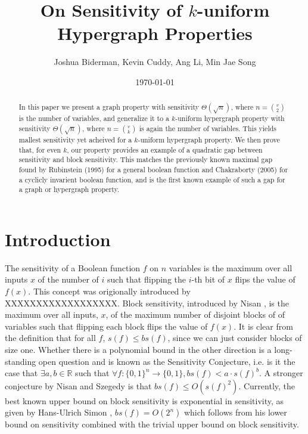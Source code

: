 \documentclass[psamsfonts]{amsart}
\theoremstyle{definition}
\theoremstyle{remark}
\numberwithin{equation}{section}
\begin{document}
	\title{On Sensitivity of $k$-uniform Hypergraph Properties}

	\author{Joshua Biderman, Kevin Cuddy, Ang Li, Min Jae Song}
	\date{\today}
	\begin{abstract}
		 In this paper we present a graph property with sensitivity $\Theta(\sqrt{n})$, where $n={v\choose2}$ is the number of variables, and generalize it to a $k$-uniform hypergraph property with sensitivity $\Theta(\sqrt{n})$, where $n={v\choose k}$ is again the number of variables. This yields mallest sensitivity yet acheived for a $k$-uniform hypergraph property. We then prove that, for even $k$, our property provides an example of a quadratic gap between sensitivity and block sensitivity. This matches the previously known maximal gap found by Rubinstein (1995) for a general boolean function and Chakraborty (2005) for a cyclicly invarient boolean function, and is the first known example of such a gap for a graph or hypergraph property.
	\end{abstract}
	\maketitle
	
	\tableofcontents
	
	\section{Introduction}
The sensitivity of a Boolean function $f$ on $n$ variables is the maximum over all inputs $x$ of the number of $i$ such that flipping the $i$-th bit of $x$ flips the value of $f(x)$. This concept was origionally introduced by XXXXXXXXXXXXXXXXXX. Block sensitivity, introduced by Nisan \cite{N}, is the maximum over all inputs, $x$, of the maximum number of disjoint blocks of of variables such that flipping each block flips the value of $f(x)$. It is clear from the definition that for all $f$, $s(f) \leq bs(f)$, since we can just consider blocks of size one.  Whether there is a polynomial bound in the other direction is a long-standing open question and is known as the Sensitivity Conjecture, i.e. is it the case that $\exists a,b\in\mathbb{R}$ such that $\forall f:\{0,1\}^n\to\{0,1\}, bs(f)<a\cdot s(f)^b$. A stronger conjecture by Nisan and Szegedy \cite{NS} is that $bs(f) \leq O(s(f)^{2})$. Currently, the best known upper bound on block sensitivity is exponential in sensitivity, as given by Hans-Ulrich Simon \cite{S}, $bs(f)=O(2^n)$ which follows from his lower bound on sensitivity combined with the trivial upper bound on block sensitivity.
\end{document}
